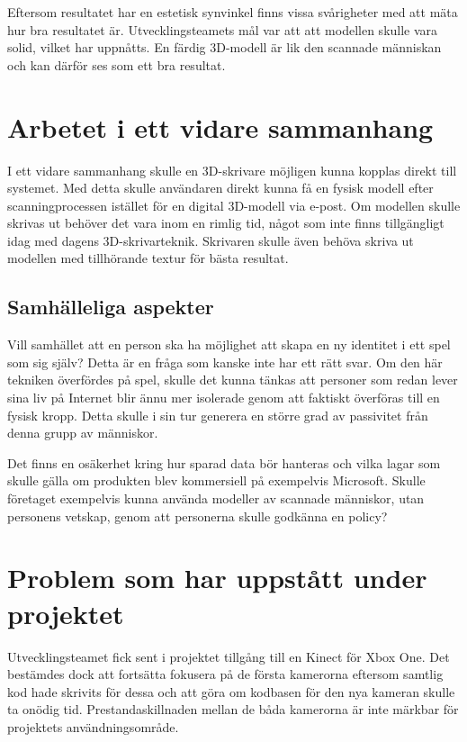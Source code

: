 \documentclass[a4paper,12pt,oneside,final]{extbook}
\begin{document}
Eftersom resultatet har en estetisk synvinkel finns vissa svårigheter med att mäta hur bra resultatet är. Utvecklingsteamets mål var att att modellen skulle vara solid, vilket har uppnåtts. En färdig 3D-modell är lik den scannade människan och kan därför ses som ett bra resultat.

\section{Arbetet i ett vidare sammanhang}
I ett vidare sammanhang skulle en 3D-skrivare möjligen kunna kopplas direkt till systemet. Med detta skulle användaren direkt kunna få en fysisk modell efter scanningprocessen istället för en digital 3D-modell via e-post. Om modellen skulle skrivas ut behöver det vara inom en rimlig tid, något som inte finns tillgängligt idag med dagens 3D-skrivarteknik. Skrivaren skulle även behöva skriva ut modellen med tillhörande textur för bästa resultat.

\subsection{Samhälleliga aspekter}
Vill samhället att en person ska ha möjlighet att skapa en ny identitet i ett spel som sig själv? Detta är en fråga som kanske inte har ett rätt svar. Om den här tekniken överfördes på spel, skulle det kunna tänkas att personer som redan lever sina liv på Internet blir ännu mer isolerade genom att faktiskt överföras till en fysisk kropp. Detta skulle i sin tur generera en större grad av passivitet från denna grupp av människor.

Det finns en osäkerhet kring hur sparad data bör hanteras och vilka lagar som skulle gälla om produkten blev kommersiell på exempelvis Microsoft.
Skulle företaget exempelvis kunna använda modeller av scannade människor, utan personens vetskap, genom att personerna skulle godkänna en policy?

\section {Problem som har uppstått under projektet}
Utvecklingsteamet fick sent i projektet tillgång till en Kinect för Xbox One. Det bestämdes dock att fortsätta fokusera på de första kamerorna eftersom samtlig kod hade skrivits för dessa och att göra om kodbasen för den nya kameran skulle ta onödig tid. Prestandaskillnaden mellan de båda kamerorna är inte märkbar för projektets användningsområde.
\end{document}
